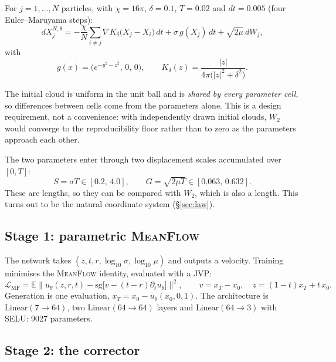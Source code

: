 ﻿\documentclass[11pt,a4paper]{article}
\newcommand{\Wtwo}{W_2}
\newcommand{\mf}{\textsc{MeanFlow}}
\begin{document}
For $j=1,\dots,N$ particles, with $\chi=16\pi$, $\delta=0.1$, $T=0.02$ and $dt=0.005$ (four
Euler--Maruyama steps):
\begin{equation}
dX_j^{N,\theta}
=-\frac{\chi}{N}\sum_{i\neq j}\nabla K_\delta\big(X_j-X_i\big)\,dt
+\sigma\,g(X_j)\,dt+\sqrt{2\mu}\,dW_j,
\label{eq:sde}
\end{equation}
with
\begin{equation}
g(x)=\big(e^{-y^2-z^2},\,0,\,0\big),
\qquad
K_\delta(z)=\frac{|z|}{4\pi\big(|z|^2+\delta^2\big)} .
\end{equation}

The initial cloud is uniform in the unit ball and is \emph{shared by every parameter cell}, so
differences between cells come from the parameters alone. This is a design requirement, not a
convenience: with independently drawn initial clouds, $\Wtwo$ would converge to the
reproducibility floor rather than to zero as the parameters approach each other.

The two parameters enter through two displacement scales accumulated over $[0,T]$:
\begin{equation}
S=\sigma T\in[0.2,\,4.0],
\qquad
G=\sqrt{2\mu T}\in[0.063,\,0.632].
\label{eq:displacements}
\end{equation}
These are lengths, so they can be compared with $\Wtwo$, which is also a length. This turns out
to be the natural coordinate system (\S\ref{sec:law}).

\subsection{Stage 1: parametric \mf{}}

The network takes $(z,t,r,\log_{10}\sigma,\log_{10}\mu)$ and outputs a velocity. Training
minimises the \mf{} identity, evaluated with a JVP:
\begin{equation}
\mathcal{L}_{\text{MF}}
=\mathbb{E}\Big\|u_\theta(z,r,t)-\mathrm{sg}\big[v-(t-r)\partial_t u_\theta\big]\Big\|^2,
\qquad
v=x_T-x_0,\quad z=(1-t)x_T+t\,x_0 .
\label{eq:mf-loss}
\end{equation}
Generation is one evaluation, $x_T=x_0-u_\theta(x_0,0,1)$. The architecture is
$\mathrm{Linear}(7\to64)$, two $\mathrm{Linear}(64\to64)$ layers and $\mathrm{Linear}(64\to3)$
with SELU: \num{9027} parameters.

\subsection{Stage 2: the corrector}
\end{document}
